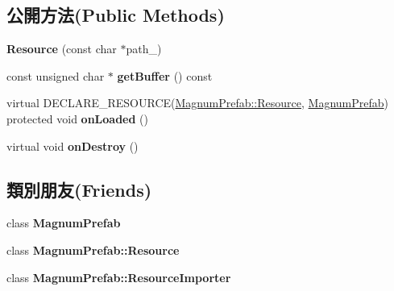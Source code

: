 \subsection*{公開方法(Public Methods)}
\begin{DoxyCompactItemize}
\item 
{\bfseries Resource} (const char $\ast$path\+\_\+)\hypertarget{class_magnum_1_1_magnum_prefab_1_1_resource_a95f702481d7895cfa92aa8f89d622db7}{}\label{class_magnum_1_1_magnum_prefab_1_1_resource_a95f702481d7895cfa92aa8f89d622db7}

\item 
const unsigned char $\ast$ {\bfseries get\+Buffer} () const \hypertarget{class_magnum_1_1_magnum_prefab_1_1_resource_a4e457559d6defadcaa5020706db15576}{}\label{class_magnum_1_1_magnum_prefab_1_1_resource_a4e457559d6defadcaa5020706db15576}

\item 
virtual D\+E\+C\+L\+A\+R\+E\+\_\+\+R\+E\+S\+O\+U\+R\+CE(\hyperlink{class_magnum_1_1_magnum_prefab_1_1_resource}{Magnum\+Prefab\+::\+Resource}, \hyperlink{class_magnum_1_1_magnum_prefab}{Magnum\+Prefab}) protected void {\bfseries on\+Loaded} ()\hypertarget{class_magnum_1_1_magnum_prefab_1_1_resource_a772a48c8912c2554830ec74c00a44f89}{}\label{class_magnum_1_1_magnum_prefab_1_1_resource_a772a48c8912c2554830ec74c00a44f89}

\item 
virtual void {\bfseries on\+Destroy} ()\hypertarget{class_magnum_1_1_magnum_prefab_1_1_resource_aaade2c8852d1336874beb21a4ea35792}{}\label{class_magnum_1_1_magnum_prefab_1_1_resource_aaade2c8852d1336874beb21a4ea35792}

\end{DoxyCompactItemize}
\subsection*{類別朋友(Friends)}
\begin{DoxyCompactItemize}
\item 
class {\bfseries Magnum\+Prefab}\hypertarget{class_magnum_1_1_magnum_prefab_1_1_resource_af673f35827b6a2ca5306beed6f132f97}{}\label{class_magnum_1_1_magnum_prefab_1_1_resource_af673f35827b6a2ca5306beed6f132f97}

\item 
class {\bfseries Magnum\+Prefab\+::\+Resource}\hypertarget{class_magnum_1_1_magnum_prefab_1_1_resource_a96406f0ce756fc948a514e9f70ce0305}{}\label{class_magnum_1_1_magnum_prefab_1_1_resource_a96406f0ce756fc948a514e9f70ce0305}

\item 
class {\bfseries Magnum\+Prefab\+::\+Resource\+Importer}\hypertarget{class_magnum_1_1_magnum_prefab_1_1_resource_a4eb47515c2ca88e47be1dcbb51810ba6}{}\label{class_magnum_1_1_magnum_prefab_1_1_resource_a4eb47515c2ca88e47be1dcbb51810ba6}

\end{DoxyCompactItemize}
